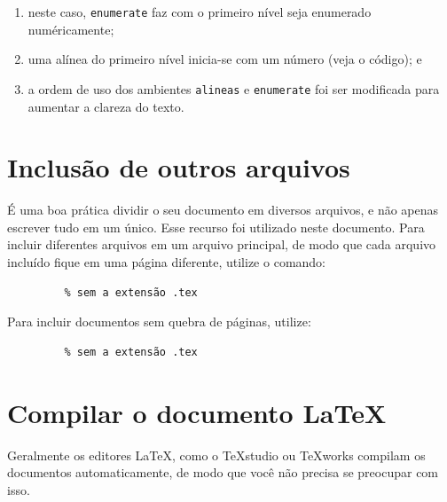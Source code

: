   \begin{enumerate}
    \item neste caso, \texttt{enumerate} faz com o primeiro nível seja enumerado
    	numéricamente;
    \item uma alínea do primeiro nível inicia-se com um número (veja o código); e
    \item a ordem de uso dos ambientes \texttt{alineas} e \texttt{enumerate} 
     foi ser modificada para aumentar a clareza do texto.
  \end{enumerate}

\section{Inclusão de outros arquivos}\label{sec-include}

É uma boa prática dividir o seu documento em diversos arquivos, e não
apenas escrever tudo em um único. Esse recurso foi utilizado neste
documento. Para incluir diferentes arquivos em um arquivo principal,
de modo que cada arquivo incluído fique em uma página diferente, utilize o
comando:

\begin{verbatim}
         % sem a extensão .tex
\end{verbatim}

Para incluir documentos sem quebra de páginas, utilize:

\begin{verbatim}
         % sem a extensão .tex
\end{verbatim}

\section{Compilar o documento \LaTeX}

Geralmente os editores \LaTeX, como o \TeX{}studio ou \TeX{}works
compilam os documentos automaticamente, de modo que você não precisa se
preocupar com isso.


